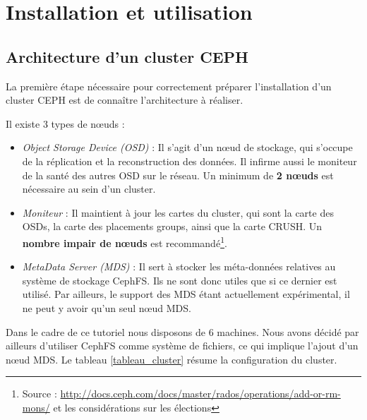 \section{Installation et utilisation}

\subsection{Architecture d'un cluster CEPH}

La première étape nécessaire pour correctement préparer l'installation d'un cluster CEPH est de connaître l'architecture à réaliser.

Il existe 3 types de nœuds :

\begin{itemize}
	\item \textit{Object Storage Device (OSD)} : Il s'agit d'un nœud de stockage, qui s'occupe de la réplication et la reconstruction des données. Il infirme aussi le moniteur de la santé des autres OSD sur le réseau. Un minimum de \textbf{2 nœuds} est nécessaire au sein d'un cluster. 
    
    \item \textit{Moniteur} : Il maintient à jour les cartes du cluster, qui sont la carte des OSDs, la carte des \og{}placements groups\fg{}, ainsi que la carte CRUSH. Un \textbf{nombre impair de nœuds}  est recommandé\footnote{Source : \url{http://docs.ceph.com/docs/master/rados/operations/add-or-rm-mons/} et les considérations sur les élections}.
    
    \item \textit{MetaData Server (MDS)} : Il sert à stocker les méta-données relatives au système de stockage CephFS. Ils ne sont donc utiles que si ce dernier est utilisé. Par ailleurs, le support des MDS étant actuellement expérimental, il ne peut y avoir qu'un seul nœud MDS.
\end{itemize}

Dans le cadre de ce tutoriel nous disposons de 6 machines. Nous avons décidé par ailleurs d'utiliser CephFS comme système de fichiers, ce qui implique l'ajout d'un nœud MDS. Le tableau \ref{tableau_cluster} résume la configuration du cluster.

